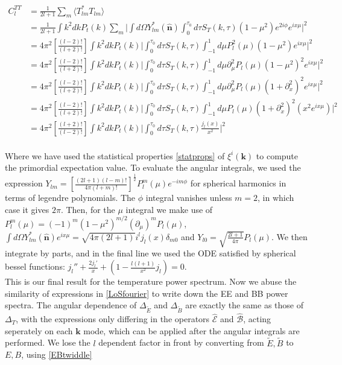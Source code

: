 \documentclass[a4paper,10pt]{article}
\renewcommand{\v}[1]{\mathbf{#1}}
\newcommand{\half}{\frac{1}{2}}
\newcommand{\unit}[1]{\hat{\v{#1}}}
\newcommand{\ltwo}{[\frac{(l+2)!}{(l-2)!}]}
\newcommand{\ltwof}{[\frac{(l-2)!}{(l+2)!}]}
\begin{document}
\begin{equation}\begin{split}
C_l^{TT} &= \frac{1}{2l+1}\sum_m \langle T_{lm}^*T_{lm} \rangle \\
&= \frac{1}{2l+1} \int k^2 dk P_t(k) \sum_m \bigg| \int d\Omega Y^*_{lm}(\unit{n}) \int_0^{\tau_0} d\tau  S_T(k,\tau)(1-\mu^2)e^{2i\phi}e^{ix\mu} \bigg|^2\\
&= 4\pi^2\ltwof \int k^2 dk P_t(k) \bigg|  \int_0^{\tau_0} d\tau  S_T(k,\tau)\int_{-1}^1 d\mu P_l^2(\mu)(1-\mu^2)e^{ix\mu} \bigg|^2\\
&= 4\pi^2\ltwof \int k^2 dk P_t(k) \bigg|  \int_0^{\tau_0} d\tau  S_T(k,\tau)\int_{-1}^1 d\mu \partial_\mu^2P_l(\mu)(1-\mu^2)^2e^{ix\mu}\bigg|^2\\
&= 4\pi^2\ltwof \int k^2 dk P_t(k) \bigg|  \int_0^{\tau_0} d\tau  S_T(k,\tau)\int_{-1}^1 d\mu \partial_\mu^2P_l(\mu)(1+\partial_x^2)^2e^{ix\mu} \bigg|^2\\
&= 4\pi^2\ltwof \int k^2 dk P_t(k) \bigg|  \int_0^{\tau_0} d\tau  S_T(k,\tau)\int_{-1}^1 d\mu P_l(\mu)(1+\partial_x^2)^2(x^2e^{ix\mu}) \bigg|^2\\
&= 4\pi^2\ltwo \int k^2 dk P_t(k) \bigg|  \int_0^{\tau_0} d\tau  S_T(k,\tau)\frac{j_l(x)}{x^2} \bigg|^2\\
\end{split}\end{equation}

Where we have used the statistical properties \ref{statprops} of $\xi^i(\v{k})$ to compute the primordial expectation value. To evaluate the angular integrals, we used the expression $Y_{lm} = [\frac{(2l+1)(l-m)!}{4\pi(l+m)!}]^\half P_l^m(\mu)e^{-im\phi}$ for spherical harmonics in terms of legendre polynomials. The  $\phi$ integral vanishes unless $m=2$, in which case it gives $2\pi$. Then, for the $\mu$ integral we make use of $P^m_l(\mu)=(-1)^m(1-\mu^2)^{m/2}(\partial_\mu)^mP_l(\mu)$, $\int d\Omega Y_{lm}^*(\unit{n})e^{ix\mu} = \sqrt{4\pi(2l+1)}i^l j_l(x) \delta_{m0}$ and $Y_{l0} = \sqrt{\frac{2l+1}{4\pi}}P_l(\mu)$. We then integrate by parts, and in the final line we used the ODE satisfied by spherical bessel functions: $j_l''+\frac{2j_l'}{x}+(1-\frac{l(l+1)}{x^2}j_l)=0$.\\


This is our final result for the temperature power spectrum. Now we abuse the similarity of expressions in \ref{LoSfourier} to write down the EE and BB power spectra. The angular dependence of $\Delta_{\tilde{E}}$ and $\Delta_{\tilde{B}}$ are exactly the same as those of $\Delta_T$, with the expressions only differing in the operators $\hat{\mathcal{E}}$ and $\hat{\mathcal{B}}$, acting seperately on each $\v{k}$ mode, which can be applied after the angular integrals are performed. We lose the $l$ dependent factor in front by converting from $\tilde{E}, \tilde{B}$ to $E,B$, using \ref{EBtwiddle}
\end{document}
